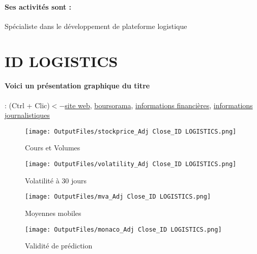 \documentclass[11pt,a4paper]{report}%
\begin{document}
\paragraph{Ses activités sont : } Spécialiste dans le développement de plateforme logistique 
    
    \newpage

\section{ID LOGISTICS}

\paragraph{Voici un présentation graphique du titre} : (Ctrl + Clic)$<-$\href{https://www.id-logistics.com/fr/finance/}{site web}, \href{https://www.boursorama.com/cours/1rPIDL}{boursorama}, \href{https://www.qwant.com/?q=site:https:%2f%2fwww.easybourse.com%2faction-societe%2fID-LOGISTICS&t=web&client=ext-firefox-hp}{informations financières}, \href{https://bourse.lerevenu.com/cours-de-bourse/fiche-valeur-synthese/ID-LOGISTICS/IDL-FR}{informations journalistiques}
\begin{figure}[!htb]
   \begin{minipage}{0.5\textwidth}
     \centering
     \texttt{[image: OutputFiles/stockprice\_Adj Close\_ID LOGISTICS.png]}
     \caption{Cours et Volumes}\label{Fig:price_ID LOGISTICS}
   \end{minipage}\hfill
   \begin{minipage}{0.5\textwidth}
     \centering
     \texttt{[image: OutputFiles/volatility\_Adj Close\_ID LOGISTICS.png]}
     \caption{Volatilité à 30 jours}\label{Fig:volat_ID LOGISTICS}
   \end{minipage}
\end{figure}
\begin{figure}[!htb]
   \begin{minipage}{0.5\textwidth}
     \centering
     \texttt{[image: OutputFiles/mva\_Adj Close\_ID LOGISTICS.png]}
     \caption{Moyennes mobiles}\label{Fig:mva_ID LOGISTICS}
   \end{minipage}\hfill
   \begin{minipage}{0.5\textwidth}
     \centering
     \texttt{[image: OutputFiles/monaco\_Adj Close\_ID LOGISTICS.png]}
     \caption{Validité de prédiction}\label{Fig:prediction_ID LOGISTICS}
   \end{minipage}
\end{figure}
\end{document}
